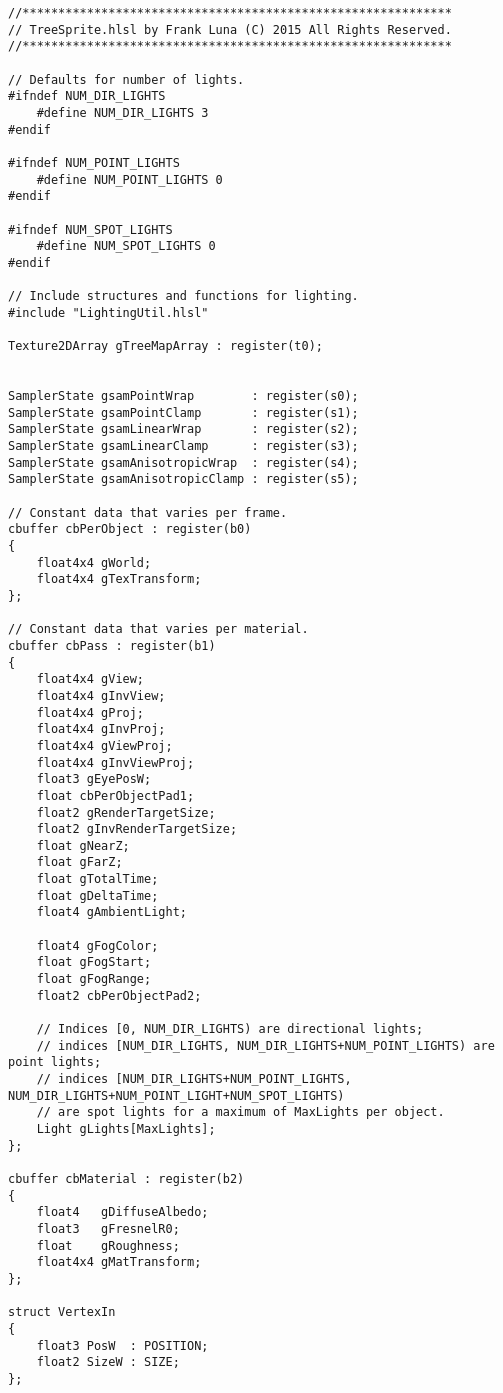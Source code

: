 \begin{lstlisting}
//************************************************************
// TreeSprite.hlsl by Frank Luna (C) 2015 All Rights Reserved.
//************************************************************

// Defaults for number of lights.
#ifndef NUM_DIR_LIGHTS
    #define NUM_DIR_LIGHTS 3
#endif

#ifndef NUM_POINT_LIGHTS
    #define NUM_POINT_LIGHTS 0
#endif

#ifndef NUM_SPOT_LIGHTS
    #define NUM_SPOT_LIGHTS 0
#endif

// Include structures and functions for lighting.
#include "LightingUtil.hlsl"

Texture2DArray gTreeMapArray : register(t0);


SamplerState gsamPointWrap        : register(s0);
SamplerState gsamPointClamp       : register(s1);
SamplerState gsamLinearWrap       : register(s2);
SamplerState gsamLinearClamp      : register(s3);
SamplerState gsamAnisotropicWrap  : register(s4);
SamplerState gsamAnisotropicClamp : register(s5);

// Constant data that varies per frame.
cbuffer cbPerObject : register(b0)
{
    float4x4 gWorld;
    float4x4 gTexTransform;
};

// Constant data that varies per material.
cbuffer cbPass : register(b1)
{
    float4x4 gView;
    float4x4 gInvView;
    float4x4 gProj;
    float4x4 gInvProj;
    float4x4 gViewProj;
    float4x4 gInvViewProj;
    float3 gEyePosW;
    float cbPerObjectPad1;
    float2 gRenderTargetSize;
    float2 gInvRenderTargetSize;
    float gNearZ;
    float gFarZ;
    float gTotalTime;
    float gDeltaTime;
    float4 gAmbientLight;

    float4 gFogColor;
    float gFogStart;
    float gFogRange;
    float2 cbPerObjectPad2;

    // Indices [0, NUM_DIR_LIGHTS) are directional lights;
    // indices [NUM_DIR_LIGHTS, NUM_DIR_LIGHTS+NUM_POINT_LIGHTS) are point lights;
    // indices [NUM_DIR_LIGHTS+NUM_POINT_LIGHTS, NUM_DIR_LIGHTS+NUM_POINT_LIGHT+NUM_SPOT_LIGHTS)
    // are spot lights for a maximum of MaxLights per object.
    Light gLights[MaxLights];
};

cbuffer cbMaterial : register(b2)
{
    float4   gDiffuseAlbedo;
    float3   gFresnelR0;
    float    gRoughness;
    float4x4 gMatTransform;
};
 
struct VertexIn
{
    float3 PosW  : POSITION;
    float2 SizeW : SIZE;
};


\end{lstlisting}
